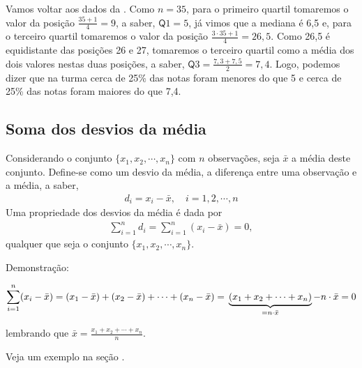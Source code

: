 Vamos voltar aos dados da . Como \(n=35\), para o primeiro quartil tomaremos o valor da posição \(\frac{35+1}{4}=9\), a saber, \(\textsf{Q}1=5\), já vimos que a mediana é 6,5 e, para o terceiro quartil tomaremos o valor da posição \(\frac{3\cdot 35+1}{4}=26,5\). Como 26,5 é equidistante das posições 26 e 27, tomaremos o terceiro quartil como a média dos dois valores nestas duas posições, a saber, \(\textsf{Q}3=\frac{7,3+7,5}{2}=7,4\). Logo, podemos dizer que na turma cerca de 25\% das notas foram menores do que 5 e cerca de 25\% das notas foram maiores do que 7,4.

\subsection{Soma dos desvios da média}

Considerando o conjunto \(\{ x_1,x_2,\cdots, x_n\}\) com \(n\) observações, seja \(\bar{x}\) a média deste conjunto.  Define-se como um desvio da média, a diferença entre uma observação e a média, a saber,
\begin{equation*}
\begin{split}d_i=x_i-\bar{x}, \quad i=1,2,\cdots, n\end{split}
\end{equation*}
Uma propriedade dos desvios da média é dada por
\begin{equation*}
\begin{split}\sum^n_{i=1}d_i=\sum^n_{i=1}(x_i-\bar{x})=0,\end{split}
\end{equation*}
qualquer que seja o conjunto \(\{ x_1,x_2,\cdots, x_n\}\).

Demonstração:

\(\displaystyle{\sum^n_{i=1}} (x_i-\bar{x})=(x_1-\bar{x})+(x_2-\bar{x})+\cdots+(x_n-\bar{x})=\\ \underbrace{(x_1+x_2+\cdots +x_n)}_{=n\cdot \bar{x}} - n\cdot \bar{x}=0\)

lembrando que \(\bar{x}=\frac{x_1+x_2+\cdots+x_n}{n}\).

Veja um exemplo na seção .


